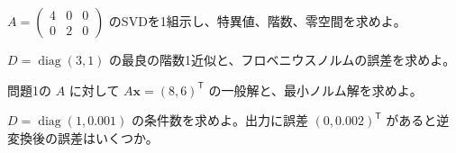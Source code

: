 \documentclass[11pt]{article}
\begin{document}

\problem[長方形行列のSVD]
$A=\begin{pmatrix}4&0&0\\0&2&0\end{pmatrix}$ のSVDを1組示し、特異値、階数、零空間を求めよ。
\workspace{38mm}

\problem[低ランク近似]
$D=\operatorname{diag}(3,1)$ の最良の階数1近似と、フロベニウスノルムの誤差を求めよ。
\workspace{38mm}
\newpage

\problem[擬似逆と最小ノルム]
問題1の $A$ に対して $A\boldsymbol x=(8,6)^{\mathsf T}$ の一般解と、最小ノルム解を求めよ。
\workspace{38mm}

\problem[誤差増幅]
$D=\operatorname{diag}(1,0.001)$ の条件数を求めよ。出力に誤差 $(0,0.002)^{\mathsf T}$ があると逆変換後の誤差はいくつか。
\workspace{38mm}
\end{document}
